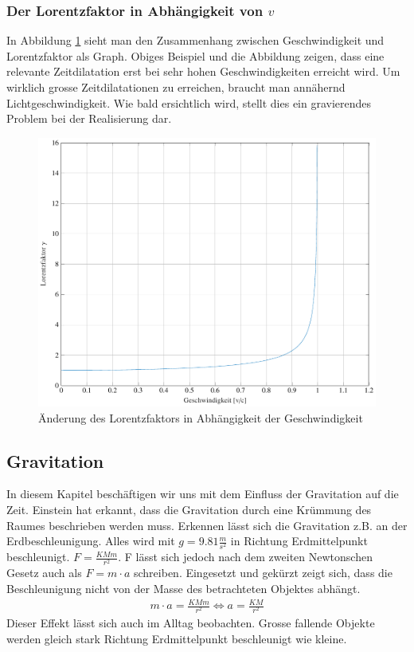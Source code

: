 \begin{refsection}
\subsubsection{Der Lorentzfaktor in Abhängigkeit von $v$}

In Abbildung \ref{skript:zeitreisen:fig:lorentz} sieht man den Zusammenhang zwischen Geschwindigkeit und Lorentzfaktor als Graph. Obiges Beispiel und die Abbildung zeigen, dass eine relevante Zeitdilatation erst bei sehr hohen Geschwindigkeiten erreicht wird. Um wirklich grosse Zeitdilatationen zu erreichen, braucht man annähernd Lichtgeschwindigkeit. Wie bald ersichtlich wird, stellt dies ein gravierendes Problem bei der Realisierung dar.
\begin{figure}[H]
   \centering
   \includegraphics[width=12cm]{zeitreisen/tikz/lorentz.pdf}
   \caption{Änderung des Lorentzfaktors in Abh\"angigkeit der Geschwindigkeit}
   \label{skript:zeitreisen:fig:lorentz} 
\end{figure}
\subsection{Gravitation} \label{Gravitation}

	In diesem Kapitel beschäftigen wir uns mit dem Einfluss der Gravitation auf die Zeit. Einstein hat erkannt, dass die Gravitation durch eine Krümmung des Raumes beschrieben werden muss. Erkennen lässt sich die Gravitation z.B. an der Erdbeschleunigung. Alles wird mit $g=9.81\frac{m}{s^2}$ in Richtung Erdmittelpunkt beschleunigt. $F=\frac{KMm}{r^2}$. F lässt sich jedoch nach dem zweiten Newtonschen Gesetz auch als $F=m\cdot a$ schreiben. Eingesetzt und gekürzt zeigt sich, dass die Beschleunigung nicht von der Masse des betrachteten Objektes abhängt.
	\begin{align*}
		m\cdot a = \frac{KMm}{r^2} \Leftrightarrow a=\frac{KM}{r^2} 
	\end{align*}
	Dieser Effekt lässt sich auch im Alltag beobachten. Grosse fallende Objekte werden gleich stark Richtung Erdmittelpunkt beschleunigt wie kleine.
	

\end{refsection}

